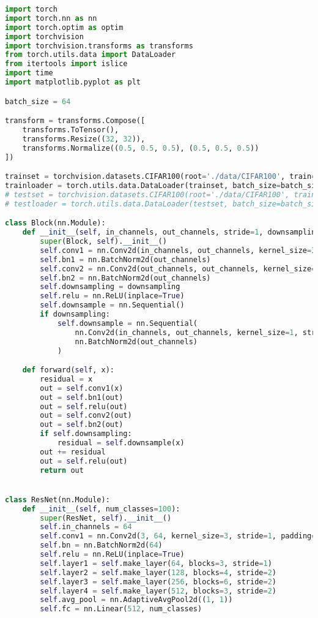 \documentclass[a4paper, 14pt]{extarticle}
\begin{document}
\begin{lstlisting}[language=Python,caption={ResNet.py},label={lst:code3}]
import torch
import torch.nn as nn
import torch.optim as optim
import torchvision
import torchvision.transforms as transforms
from torch.utils.data import DataLoader
from itertools import islice
import time
import matplotlib.pyplot as plt

batch_size = 64

transform = transforms.Compose([
    transforms.ToTensor(),
    transforms.Resize((32, 32)),
    transforms.Normalize((0.5, 0.5, 0.5), (0.5, 0.5, 0.5))
])

trainset = torchvision.datasets.CIFAR100(root='./data/CIFAR100', train=True, download=True, transform=transform)
trainloader = torch.utils.data.DataLoader(trainset, batch_size=batch_size, shuffle=True, num_workers=2)
# testset = torchvision.datasets.CIFAR100(root='./data/CIFAR100', train=False, download=True, transform=transform)
# testloader = torch.utils.data.DataLoader(testset, batch_size=batch_size, shuffle=True, num_workers=2)

class Block(nn.Module):
    def __init__(self, in_channels, out_channels, stride=1, downsampling=False):
        super(Block, self).__init__()
        self.conv1 = nn.Conv2d(in_channels, out_channels, kernel_size=3, stride=stride, padding=1, bias=False)
        self.bn1 = nn.BatchNorm2d(out_channels)
        self.conv2 = nn.Conv2d(out_channels, out_channels, kernel_size=3, stride=1, padding=1, bias=False)
        self.bn2 = nn.BatchNorm2d(out_channels)
        self.downsampling = downsampling
        self.relu = nn.ReLU(inplace=True)
        self.downsample = nn.Sequential()
        if downsampling:
            self.downsample = nn.Sequential(
                nn.Conv2d(in_channels, out_channels, kernel_size=1, stride=stride, bias=False),
                nn.BatchNorm2d(out_channels)
            )

    def forward(self, x):
        residual = x
        out = self.conv1(x)
        out = self.bn1(out)
        out = self.relu(out)
        out = self.conv2(out)
        out = self.bn2(out)
        if self.downsampling:
            residual = self.downsample(x)
        out += residual
        out = self.relu(out)
        return out


class ResNet(nn.Module):
    def __init__(self, num_classes=100):
        super(ResNet, self).__init__()
        self.in_channels = 64
        self.conv1 = nn.Conv2d(3, 64, kernel_size=3, stride=1, padding=1, bias=False)
        self.bn = nn.BatchNorm2d(64)
        self.relu = nn.ReLU(inplace=True)
        self.layer1 = self.make_layer(64, blocks=3, stride=1)
        self.layer2 = self.make_layer(128, blocks=4, stride=2)
        self.layer3 = self.make_layer(256, blocks=6, stride=2)
        self.layer4 = self.make_layer(512, blocks=3, stride=2)
        self.avg_pool = nn.AdaptiveAvgPool2d((1, 1))
        self.fc = nn.Linear(512, num_classes)


\end{lstlisting}
\end{document}
